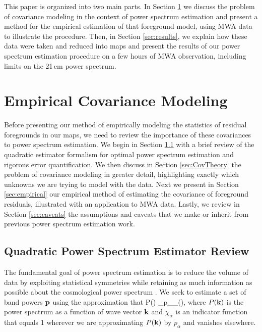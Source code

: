 This paper is organized into two main parts. In Section \ref{sec:methods} we discuss the problem of covariance modeling in the context of power spectrum estimation and present a method for the empirical estimation of that foreground model, using MWA data to illustrate the procedure. Then, in Section \ref{sec:results}, we explain how these data were taken and reduced into maps and present the results of our power spectrum estimation procedure on a few hours of MWA observation, including limits on the 21\,cm power spectrum.


\section{Empirical Covariance Modeling} \label{sec:methods}

Before presenting our method of empirically modeling the statistics of residual foregrounds in our maps, we need to review the importance of these covariances to power spectrum estimation. We begin in Section \ref{sec:review} with a brief review of the quadratic estimator formalism for optimal power spectrum estimation and rigorous error quantification. We then discuss in Section \ref{sec:CovTheory} the problem of covariance modeling in greater detail, highlighting exactly which unknowns we are trying to model with the data. Next we present in Section \ref{sec:empirical} our empirical method of estimating the covariance of foreground residuals, illustrated with an application to MWA data. Lastly, we review in Section \ref{sec:caveats} the assumptions and caveats that we make or inherit from previous power spectrum estimation work.


\subsection{Quadratic Power Spectrum Estimator Review}\label{sec:review}

The fundamental goal of power spectrum estimation is to reduce the volume of data by exploiting statistical symmetries while retaining as much information as possible about the cosmological power spectrum \citep{Maxpowerspeclossless}. We seek to estimate a set of band powers $\mathbf{p}$ using the approximation that
\beq
P(\kvec) \approx \sum_\alpha p_\alpha \chi_\alpha (\kvec),
\eeq
where $P(\mathbf{k})$ is the power spectrum as a function of wave vector $\mathbf{k}$ and $\chi_\alpha$ is an indicator function that equals 1 wherever we are approximating $P(\mathbf{k})$ by $p_\alpha$ and vanishes elsewhere.

